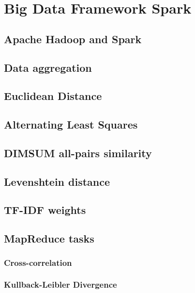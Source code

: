 
\chapter{Big Data Framework Spark}

\section{Apache Hadoop and Spark} 

\section{Data aggregation}

\section{Euclidean Distance}

\section{Alternating Least Squares}

\section{DIMSUM all-pairs similarity}

\section{Levenshtein distance}

\section{TF-IDF weights}

\section{MapReduce tasks}
\subsection{Cross-correlation}

\subsection{Kullback-Leibler Divergence}


